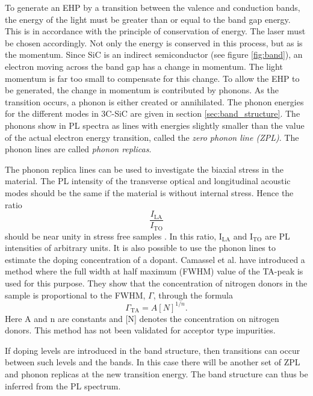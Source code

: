 To generate an EHP by a transition between the valence and conduction bands, the energy of the light must be greater than or equal to the band gap energy. This is in accordance with the principle of conservation of energy. The laser must be chosen accordingly. Not only the energy is conserved in this process, but as is the momentum. Since SiC is an indirect semiconductor (see figure \ref{fig:band}), an electron moving across the band gap has a change in momentum. The light momentum is far too small to compensate for this change. To allow the EHP to be generated, the change in momentum is contributed by phonons. As the transition occurs, a phonon is either created or annihilated. The phonon energies for the different modes in 3C-SiC are given in section \ref{sec:band_structure}. The phonons show in PL spectra as lines with energies slightly smaller than the value of the actual electron energy transition, called the \emph{zero phonon line (ZPL)}. The phonon lines are called \emph{phonon replicas}. 

The phonon replica lines can be used to investigate the biaxial stress in the material. The PL intensity of the transverse optical and longitudinal acoustic modes should be the same if the material is without internal stress. Hence the ratio 
\[\frac{I_{\mathrm{LA}}}{I_{\mathrm{TO}}}\]
should be near unity in stress free samples \cite{Sun2012b}. In this ratio, I$_\mathrm{LA}$ and I$_\mathrm{TO}$ are PL intensities of arbitrary units. It is also possible to use the phonon lines to estimate the doping concentration of a dopant. Camassel et al. have introduced a method where the full width at half maximum (FWHM) value of the TA-peak is used for this purpose. They show that the concentration of nitrogen donors in the sample is proportional to the FWHM, $\Gamma$, through the formula
\begin{equation}
\label{eq:fwhm}
\Gamma_\mathrm{TA} = A[N]^{1/n}.
\end{equation}
Here A and n are constants and [N] denotes the concentration on nitrogen donors. This method has not been validated for acceptor type impurities. 


If doping levels are introduced in the band structure, then transitions can occur between such levels and the bands. In this case there will be another set of ZPL and phonon replicas at the new transition energy. The band structure can thus be inferred from the PL spectrum. 

